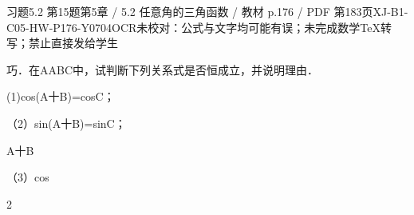 \begin{bankitem}{习题5.2 第15题}{第5章 / 5.2 任意角的三角函数 / 教材 p.176 / PDF 第183页}{XJ-B1-C05-HW-P176-Y0704}{OCR未校对：公式与文字均可能有误；未完成数学TeX转写；禁止直接发给学生}
\begin{ocrdraft}
\par
巧．在AABC中，试判断下列关系式是否恒成立，并说明理由．
\par
(1)cos(A十B)=cosC；
\par
（2）sin(A十B)=sinC；
\par
A十B
\par
（3）cos
\par
2
\end{ocrdraft}
\end{bankitem}
